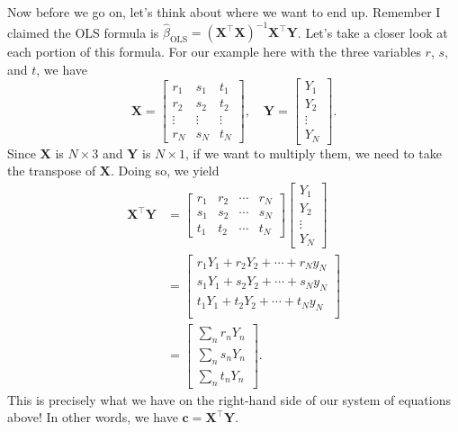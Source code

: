 \documentclass[
  12pt,
  oneside,openany]{book}
\begin{document}
Now before we go on, let's think about where we want to end up.
Remember I claimed the OLS formula is \(\hat{\beta}_{\text{OLS}} = (\mathbf{X}^\top \mathbf{X})^{-1} \mathbf{X}^\top \mathbf{Y}\).
Let's take a closer look at each portion of this formula.
For our example here with the three variables \(r\), \(s\), and \(t\), we have
\[
\mathbf{X} = \begin{bmatrix}
r_1 & s_1 & t_1 \\
r_2 & s_2 & t_2 \\
\vdots & \vdots & \vdots \\
r_N & s_N & t_N
\end{bmatrix}, \quad
\mathbf{Y} = \begin{bmatrix}
Y_1 \\ Y_2 \\ \vdots \\ Y_N
\end{bmatrix}.
\]
Since \(\mathbf{X}\) is \(N \times 3\) and \(\mathbf{Y}\) is \(N \times 1\), if we want to multiply them, we need to take the transpose of \(\mathbf{X}\).
Doing so, we yield
\[
\begin{aligned}
\mathbf{X}^\top \mathbf{Y}
&= \begin{bmatrix}
r_1 & r_2 & \cdots & r_N \\
s_1 & s_2 & \cdots & s_N \\
t_1 & t_2 & \cdots & t_N
\end{bmatrix} \begin{bmatrix}
Y_1 \\ Y_2 \\ \vdots \\ Y_N
\end{bmatrix} \\
&= \begin{bmatrix}
r_1 Y_1 + r_2 Y_2 + \cdots + r_N y_N \\
s_1 Y_1 + s_2 Y_2 + \cdots + s_N y_N \\
t_1 Y_1 + t_2 Y_2 + \cdots + t_N y_N \\
\end{bmatrix} \\
&= \begin{bmatrix}
\sum_n r_n Y_n \\ \sum_n s_n Y_n \\ \sum_n t_n Y_n
\end{bmatrix}.
\end{aligned}
\]
This is precisely what we have on the right-hand side of our system of equations above!
In other words, we have \(\mathbf{c} = \mathbf{X}^\top \mathbf{Y}\).
\end{document}
